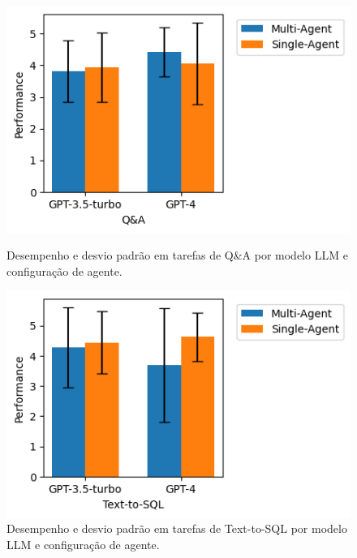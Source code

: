             \begin{figure}[h]
                \centering
                \begin{minipage}{.48\textwidth}
                    \centering                
                    \includegraphics[width=1\linewidth]{images/performance_QA.png}
                    \caption{Desempenho e desvio padrão em tarefas de Q\&A por modelo LLM e configuração de agente.\\}
                    \label{fig:performance_QA}
                \end{minipage}
                \hspace{0.2cm}
                \begin{minipage}{.48\textwidth}
                    \centering
                    \includegraphics[width=1\linewidth]{images/performance_text2sql.png}
                    \caption{Desempenho e desvio padrão em tarefas de Text-to-SQL por modelo LLM e configuração de agente.}
                    \label{fig:performance_text2sql}
                \end{minipage}%
            \end{figure}
            
